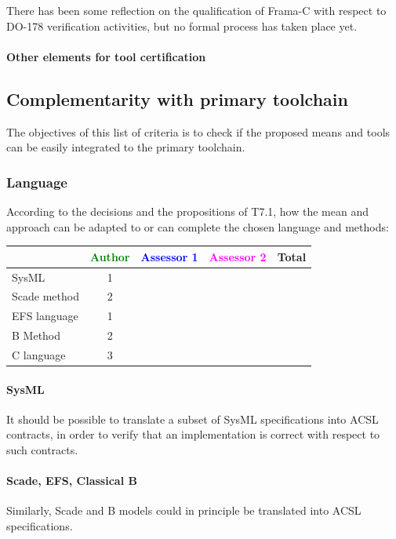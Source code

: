 \begin{author_comment}
There has been some reflection on the qualification of Frama-C with respect to
DO-178 verification activities, but no formal process has taken place yet.
\end{author_comment}

\paragraph{Other elements for tool certification}


\subsection{Complementarity with primary toolchain}

The objectives of this list of criteria is to check if the proposed means and tools can be easily integrated to the primary toolchain.

\subsubsection{Language}
\label{sec:Frama-C:language}

According to the decisions and the propositions of T7.1, how the mean and approach can be adapted to or can complete the chosen language and methods:

\begin{tabular}{|l | c | c | c | c|}
\hline
& \textcolor{green}{Author} & \textcolor{blue}{Assessor 1} & \textcolor{magenta}{Assessor 2} & Total \\
\hline 
SysML  & 1 & & & \\
\hline
Scade method & 2 & & & \\
\hline
EFS language & 1 & & & \\
\hline
B Method & 2 & & & \\
\hline
C language & 3 & & & \\
\hline
\end{tabular}

\paragraph{SysML}
It should be possible to translate a subset of SysML specifications into
ACSL contracts, in order to verify that an implementation is correct with
respect to such contracts.


\paragraph{Scade, EFS, Classical B}
Similarly, Scade and B models could in principle be translated
into ACSL specifications.

